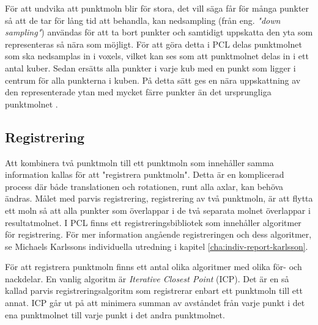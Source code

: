 För att undvika att punktmoln blir för stora, det vill säga får för många punkter så att de tar för lång tid att behandla, kan nedsampling (från eng. \textit{"down sampling"}) användas för att ta bort punkter och samtidigt uppskatta den yta som representeras så nära som möjligt. För att göra detta i PCL delas punktmolnet som ska nedsamplas in i voxels, vilket kan ses som att punktmolnet delas in i ett antal kuber. Sedan ersätts alla punkter i varje kub med en punkt som ligger i centrum för alla punkterna i kuben. På detta sätt ges en nära uppskattning av den representerade ytan med mycket färre punkter än det ursprungliga punktmolnet \cite{voxel_grid}.
 

\subsection{Registrering}
Att kombinera två punktmoln till ett punktmoln som innehåller samma information kallas för att "registrera punktmoln". Detta är en komplicerad process där både translationen och rotationen, runt alla axlar, kan behöva ändras. Målet med parvis registrering, registrering av två punktmoln, är att flytta ett moln så att alla punkter som överlappar i de två separata molnet överlappar i resultatmolnet. I PCL finns ett registreringsbibliotek som innehåller algoritmer för registrering\cite{pcl_registration}. För mer information angående registreringen och dess algoritmer, se Michaels Karlssons individuella utredning i kapitel \ref{cha:indiv-report-karlsson}.  


För att registrera punktmoln finns ett antal olika algoritmer med olika för- och nackdelar. En vanlig algoritm är \textit{Iterative Closest Point} (ICP). Det är en så kallad parvis registreringsalgoritm som registrerar enbart ett punktmoln till ett annat. ICP går ut på att minimera summan av avståndet från varje punkt i det ena punktmolnet till varje punkt i det andra punktmolnet.

